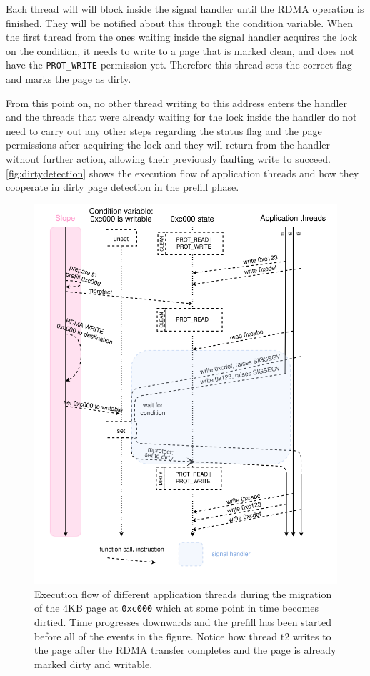 Each thread will will block inside the signal handler until
the RDMA operation is finished. They will be notified about this through the
condition variable. When the first thread from the ones waiting inside the
signal handler acquires the lock on the condition, it needs to write to a
page that is marked clean, and does not have the \texttt{PROT\_WRITE}
permission yet. Therefore this thread sets the correct flag and marks the page as
dirty.

From this point on, no other thread writing to this address enters the
handler and the threads that were already waiting for the lock inside the
handler do not need
to carry out any other steps regarding the status flag and the page permissions
after acquiring the lock and they will
return from the handler without further action, allowing their previously
faulting write to succeed.
\autoref{fig:dirtydetection} shows the execution flow of application threads
and how they cooperate in dirty page detection in the prefill phase.

\begin{figure}[tp]
\centering

\includegraphics[width=1\textwidth]{dirty-detection.drawio}
\caption{
    Execution flow of different application threads during the migration of
    the 4KB page at \texttt{0xc000} which at some point in time becomes dirtied.
    Time progresses downwards and the prefill has been started before all of
    the events in the figure. Notice how thread t2 writes to the page after the
    RDMA transfer completes and the page is already marked dirty and writable.
}
\label{fig:dirtydetection}
\end{figure}

